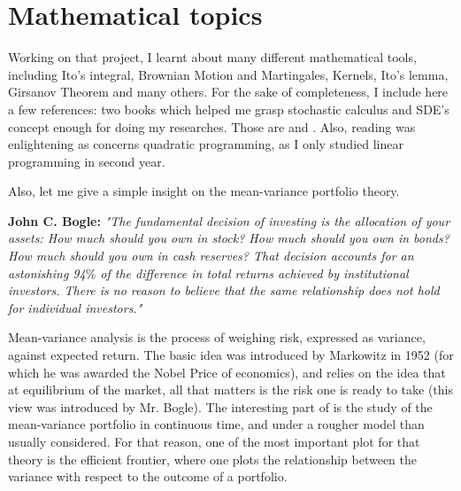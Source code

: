 \section{Mathematical topics}

Working on that project, I learnt about many different mathematical tools, including Ito's integral, Brownian Motion and Martingales, Kernels, Ito's lemma, Girsanov Theorem and many others. For the sake of completeness, I include here a few references: two books which helped me grasp stochastic calculus and SDE's concept enough for doing my researches. Those are \cite{mikosch} and \cite{oksendal}. Also, reading \cite{Opti_Luen} was enlightening as concerns quadratic programming, as I only studied linear programming in second year.  

Also, let me give a simple insight on the mean-variance portfolio theory.

\textbf{John C. Bogle:}
\textit{"The fundamental decision of investing is the allocation of your assets: How much should you own in stock? How much should you own in bonds? How much should you own in cash reserves? That decision accounts for an astonishing 94$\%$ of the difference in total returns achieved by institutional investors. There is no reason to believe that the same relationship does not hold for individual investors."}

\begin{definition}
Mean-variance analysis is the process of weighing risk, expressed as variance, against expected return. The basic idea was introduced by Markowitz in 1952 (for which he was awarded the Nobel Price of economics), and relies on the idea that at equilibrium of the market, all that matters is the risk one is ready to take (this view was introduced by Mr. Bogle). The interesting part of \cite{HanWong} is the study of the mean-variance portfolio in continuous time, and under a rougher model than usually considered. For that reason, one of the most important plot for that theory is the efficient frontier, where one plots the relationship between the variance with respect to the outcome of a portfolio.
\end{definition}




\label{subsection:itoslemma}




